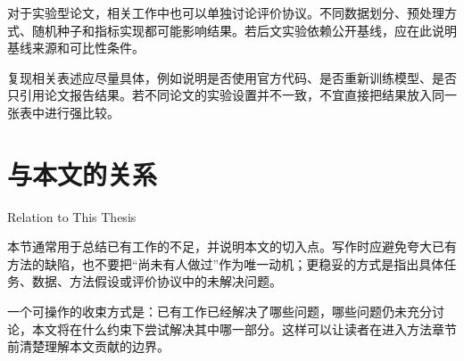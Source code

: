 对于实验型论文，相关工作中也可以单独讨论评价协议。不同数据划分、预处理方式、随机种子和指标实现都可能影响结果。若后文实验依赖公开基线，应在此说明基线来源和可比性条件。

复现相关表述应尽量具体，例如说明是否使用官方代码、是否重新训练模型、是否只引用论文报告结果。若不同论文的实验设置并不一致，不宜直接把结果放入同一张表中进行强比较。

\section{与本文的关系}{Relation to This Thesis}

本节通常用于总结已有工作的不足，并说明本文的切入点。写作时应避免夸大已有方法的缺陷，也不要把“尚未有人做过”作为唯一动机；更稳妥的方式是指出具体任务、数据、方法假设或评价协议中的未解决问题。

一个可操作的收束方式是：已有工作已经解决了哪些问题，哪些问题仍未充分讨论，本文将在什么约束下尝试解决其中哪一部分。这样可以让读者在进入方法章节前清楚理解本文贡献的边界。
